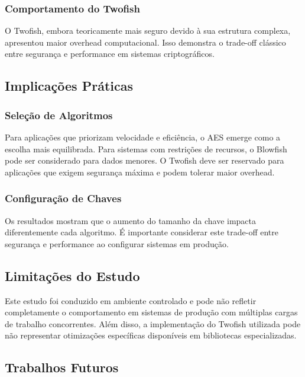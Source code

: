 \documentclass[12pt,a4paper,oneside]{article}
\begin{document}
\subsubsection{Comportamento do Twofish}

O Twofish, embora teoricamente mais seguro devido à sua estrutura complexa, apresentou maior overhead computacional. Isso demonstra o trade-off clássico entre segurança e performance em sistemas criptográficos.

\subsection{Implicações Práticas}

\subsubsection{Seleção de Algoritmos}

Para aplicações que priorizam velocidade e eficiência, o AES emerge como a escolha mais equilibrada. Para sistemas com restrições de recursos, o Blowfish pode ser considerado para dados menores. O Twofish deve ser reservado para aplicações que exigem segurança máxima e podem tolerar maior overhead.

\subsubsection{Configuração de Chaves}

Os resultados mostram que o aumento do tamanho da chave impacta diferentemente cada algoritmo. É importante considerar este trade-off entre segurança e performance ao configurar sistemas em produção.

\subsection{Limitações do Estudo}

Este estudo foi conduzido em ambiente controlado e pode não refletir completamente o comportamento em sistemas de produção com múltiplas cargas de trabalho concorrentes. Além disso, a implementação do Twofish utilizada pode não representar otimizações específicas disponíveis em bibliotecas especializadas.

\subsection{Trabalhos Futuros}
\end{document}
